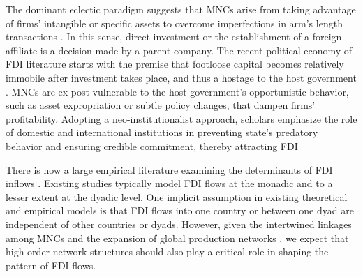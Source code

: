 \documentclass{article}
\begin{document}
The dominant eclectic paradigm suggests that MNCs arise from taking advantage of firms' intangible or specific assets to overcome imperfections in arm's length transactions \citep{Caves:1996,Dunning:1992}. In this sense, direct investment or the establishment of a foreign affiliate is a decision made by a parent company. The recent political economy of FDI literature starts with the premise that footloose capital becomes relatively immobile after investment takes place, and thus a hostage to the host government \citep{Vernon:1971,Vernon:1980}. MNCs are ex post vulnerable to the host government's opportunistic behavior, such as asset expropriation or subtle policy changes, that dampen firms' profitability. Adopting a neo-institutionalist approach, scholars emphasize the role of domestic and international institutions in preventing state's predatory behavior and ensuring credible commitment, thereby attracting FDI \citep[e.g.][]{Henisz:2000,Jensen:2003,Jensen:2006,Li_Resnick:2003,Staats_Biglaiser:2012,Buthe_Milner:2008,Allee_Peinhardt:2011}

There is now a large empirical literature examining the determinants of FDI inflows \citep[e.g.,][]{Noorbakhsh_et_al:2001,Yeaple:2003,Jensen:2003,Li_Resnick:2003,Buthe_Milner:2008,Li_Vashchilko:2010,Kerner:2009}. Existing studies typically model FDI flows at the monadic and to a lesser extent at the dyadic level. One implicit assumption in existing theoretical and empirical models is that FDI flows into one country or between one dyad are independent of other countries or dyads. However, given the intertwined linkages among MNCs and the expansion of global production networks \citep{UNCTAD:2013}, we expect that high-order network structures should also play a critical role in shaping the pattern of FDI flows. 
\end{document}
